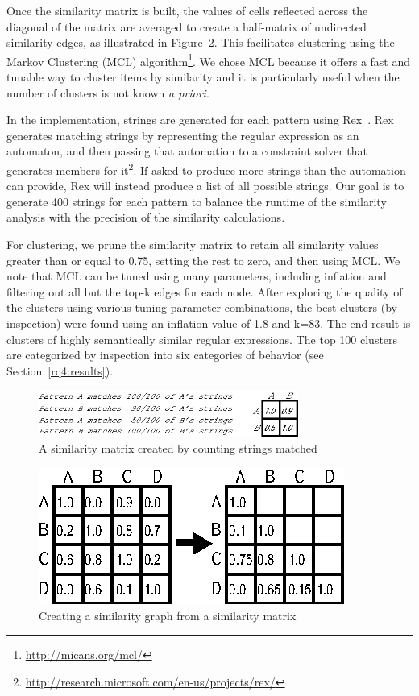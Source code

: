 Once the similarity matrix is built, the values of cells reflected across the diagonal of the matrix are averaged to create a half-matrix of undirected similarity edges, as illustrated in Figure~\ref{fig:matrixToGraph}.
This facilitates clustering using the  Markov Clustering (MCL) algorithm\footnote{\url{http://micans.org/mcl/}}.
We chose MCL  because it offers a fast and tunable way to cluster items by similarity and it is particularly useful when the number of clusters is not known \emph{a priori}.


In the implementation, strings are generated for each pattern using Rex~\cite{rex}.  Rex generates matching strings by representing the regular expression as an automaton, and then passing that automation to a constraint solver that generates members for it\footnote{\url{http://research.microsoft.com/en-us/projects/rex/}}.  If asked to produce more strings than the automation can provide, Rex will instead produce a list of all possible strings.
Our goal is to generate 400 strings for each pattern to balance the runtime of the similarity analysis with the precision of the similarity calculations.

For clustering, we prune the similarity matrix to retain all similarity values greater than or equal to 0.75, setting the rest to zero, and then using MCL.
We note that MCL can be tuned using many parameters, including inflation and filtering out all but the top-k edges for each node.
After exploring the quality of the clusters using various tuning parameter combinations, the best clusters (by inspection) were found using an inflation value of 1.8 and k=83.
The end result is clusters of highly semantically similar regular expressions.  The top 100 clusters are categorized by inspection into six categories of behavior (see Section~\ref{rq4:results}).

\begin{figure}[tb]
\centering
\includegraphics[height=0.6in]{../illustrations/minimalMatrix.eps}
\caption{A similarity matrix created by counting strings matched}
\label{fig:minimalMatrix}
\end{figure}


\begin{figure}[tb]
\centering
\includegraphics[width=0.7\columnwidth]{../illustrations/matrixToGraph.eps}
\vspace{-6pt}
\caption{Creating a similarity graph from a similarity matrix}
\vspace{-6pt}
\label{fig:matrixToGraph}
\end{figure}


